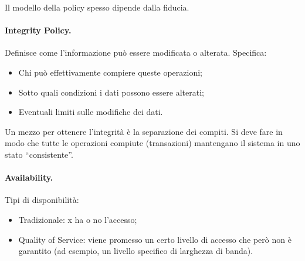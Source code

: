 Il modello della policy spesso dipende dalla fiducia.

\paragraph{Integrity Policy.}

Definisce come l’informazione può essere modificata o alterata.
Specifica:
\begin{itemize}
      \item Chi può effettivamente compiere queste operazioni;
      \item Sotto quali condizioni i dati possono essere alterati;
      \item Eventuali limiti sulle modifiche dei dati.
\end{itemize}

Un mezzo per ottenere l’integrità è la separazione dei compiti.
Si deve fare in modo che tutte le operazioni compiute (transazioni) mantengano il sistema in uno
stato “consistente”.

\paragraph{Availability.}

Tipi di disponibilità:
\begin{itemize}
      \item Tradizionale: x ha o no l’accesso;
      \item Quality of Service: viene promesso un certo livello di accesso
            che però non è garantito (ad esempio, un livello
            specifico di larghezza di banda).
\end{itemize}

